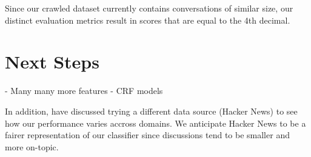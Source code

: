 \documentclass[10pt]{article}
\begin{document}
Since our crawled dataset currently contains conversations of similar size, our
distinct evaluation metrics result in scores that are equal to the 4th decimal.

\section{Next Steps}
- Many many more features
- CRF models~\cite{Wang2011a}

In addition, have discussed trying a different data source (Hacker News) to
see how our performance varies accross domains. We anticipate Hacker News
to be a fairer representation of our classifier since discussions tend to be 
smaller and more on-topic.

{} 

\end{document}
